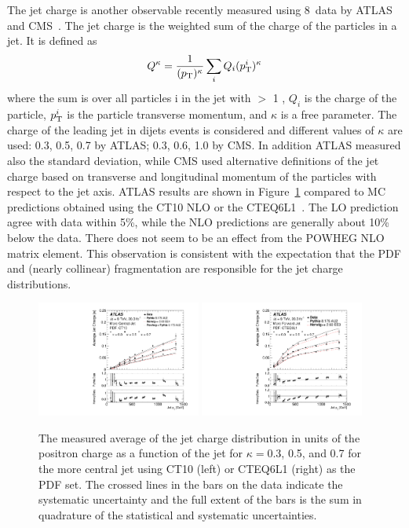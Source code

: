 \documentclass{PoS}
\begin{document}
The jet charge is another observable recently measured using 8~\TeV data by ATLAS~\cite{Aad:2015cua} and
CMS~\cite{CMS:2016yuu}. The jet charge is the \pt weighted sum of the charge of the particles in a
jet. It is defined as 
\begin{equation} \label{Omdef}
Q^\kappa = \frac{1}{(\pt)^\kappa} \sum_{i} Q_i (\pt^i)^\kappa
\end{equation}
where the sum is over all particles i in the jet with \pt $>$ 1 \GeV, $Q_i$ is the charge of the particle, $p_{\mathrm{T}}^i$ is
the particle transverse momentum, and $\kappa$ is a free parameter. The charge of the leading jet in dijets events is
considered and different values of $\kappa$ are used: 0.3, 0.5, 0.7 by ATLAS; 0.3, 0.6, 1.0 by CMS. In addition ATLAS
measured also the standard deviation, while CMS used alternative definitions of the jet charge based on transverse and
longitudinal momentum of the particles with respect to the jet axis. ATLAS results are shown in
Figure~\ref{fig:jetcharge} compared to MC predictions obtained using the CT10 NLO or the
CTEQ6L1~\cite{Pumplin:2002vw}. The LO prediction agree with data within 5\%, while the NLO predictions are generally
about 10\% below the data. There does not seem to be an effect from the POWHEG NLO matrix element.   
This observation is consistent with the expectation that the PDF and (nearly collinear) fragmentation
are responsible for the jet charge distributions.    

\begin{figure}[hbtp]
  \centering
  \includegraphics[width=0.48\textwidth]{Figure10a.pdf}
  \includegraphics[width=0.48\textwidth]{Figure10b.pdf}
  \caption{The measured average of the jet charge distribution in units of the positron charge as a function of the jet
    \pt for $\kappa=$0.3, 0.5, and 0.7 for the more central jet using CT10 (left) or CTEQ6L1 (right) as the PDF set. The crossed lines in the
    bars on the data indicate the systematic uncertainty and the full extent of the bars is the sum in quadrature of the
    statistical and systematic uncertainties. } 
  \label{fig:jetcharge}
\end{figure}
\end{document}
